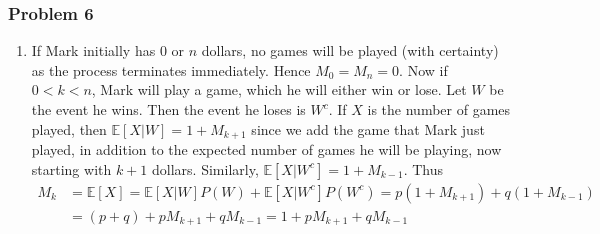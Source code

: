 \documentclass[letterpaper,12pt]{article}
\newcommand*{\erv}[1]{\mathbb{E}\left[#1\right]}
\begin{document}
\begin{flushleft}
    \subsubsection*{Problem 6}
    \begin{enumerate}[label=(\alph*)]

        \item
        If Mark initially has 0 or $n$ dollars, no games will be played (with certainty) as the process terminates immediately. Hence $M_0 = M_n = 0$. Now if $0 < k < n$, Mark will play a game, which he will either win or lose. Let $W$ be the event he wins. Then the event he loses is $W^c$. If $X$ is the number of games played, then $\erv{X|W} = 1 + M_{k+1}$ since we add the game that Mark just played, in addition to the expected number of games he will be playing, now starting with $k + 1$ dollars. Similarly, $\erv{X|W^c} = 1 + M_{k-1}$. Thus
        \begin{align*}
            M_k &= \erv{X} = \erv{X|W}P(W) + \erv{X|W^c}P(W^c) = p(1 + M_{k+1}) + q(1 + M_{k-1}) \\
            &= (p + q) + pM_{k+1} + qM_{k-1} = 1 + pM_{k+1} + qM_{k-1}
        \end{align*}


\end{enumerate}
\end{flushleft}
\end{document}

